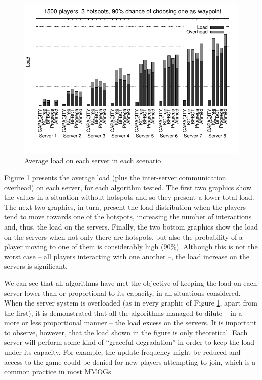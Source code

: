 \documentclass[acmjacm]{acmtrans2m}
\newcommand{\figurecaption}{Figure}
\begin{document}
\begin{figure}[!t]
	\includegraphics[width=0.495\linewidth]{data/1500players_prob90/distribution_1500_90}

	\caption{Average load on each server in each scenario}
	\label{fig:distribution}
\end{figure}

\figurecaption{} \ref{fig:distribution} presents the average load (plus the inter-server communication overhead) on each server, for each algorithm tested. The first two graphics show the values in a situation without hotspots and so they present a lower total load. The next two graphics, in turn, present the load distribution when the players tend to move towards one of the hotspots, increasing the number of interactions and, thus, the load on the servers. Finally, the two bottom graphics show the load on the servers when not only there are hotspots, but also the probability of a player moving to one of them is considerably high (90\%). Although this is not the worst case -- all players interacting with one another --, the load increase on the servers is significant.

We can see that all algorithms have met the objective of keeping the load on each server lower than or proportional to its capacity, in all situations considered. When the server system is overloaded (as in every graphic of \figurecaption{} \ref{fig:distribution}, apart from the first), it is demonstrated that all the algorithms managed to dilute -- in a more or less proportional manner -- the load excess on the servers. It is important to observe, however, that the load shown in the figure is only theoretical. Each server will perform some kind of ``graceful degradation'' in order to keep the load under its capacity. For example, the update frequency might be reduced and access to the game could be denied for new players attempting to join, which is a common practice in most MMOGs.
\end{document}
